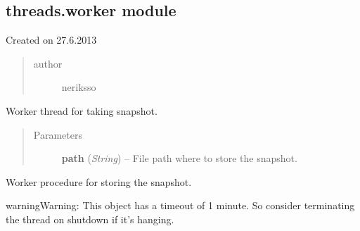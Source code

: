 \documentclass[letterpaper,10pt,english]{sphinxmanual}
\begin{document}
\subsection{threads.worker module}
\label{threads:threads-worker-module}\label{threads:module-threads.worker}
Created on 27.6.2013
\begin{quote}\begin{description}
\item[{author}] \leavevmode
neriksso

\end{description}\end{quote}

\begin{fulllineitems}
\label{threads:threads.worker.SNAPSHOT_THREAD}
Worker thread for taking snapshot.
\begin{quote}\begin{description}
\item[{Parameters}] \leavevmode
\textbf{path} (\emph{String}) -- File path where to store the snapshot.

\end{description}\end{quote}

\begin{fulllineitems}
\label{threads:threads.worker.SNAPSHOT_THREAD.run}
Worker procedure for storing the snapshot.

\begin{notice}{warning}{Warning:}
This object has a timeout of 1 minute. So consider terminating
the thread on shutdown if it's hanging.
\end{notice}

\end{fulllineitems}


\end{fulllineitems}

\end{document}

